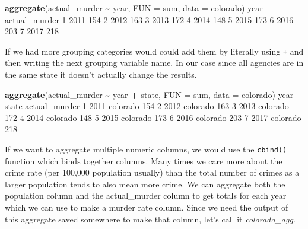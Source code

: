 \documentclass[
  12pt,
]{book}
\newenvironment{Shaded}{\begin{snugshade}}{\end{snugshade}}
\newcommand{\DataTypeTok}[1]{\textcolor[rgb]{0.27,0.27,0.27}{#1}}
\newcommand{\DecValTok}[1]{\textcolor[rgb]{0.06,0.06,0.06}{#1}}
\newcommand{\KeywordTok}[1]{\textcolor[rgb]{0.27,0.27,0.27}{\textbf{#1}}}
\newcommand{\NormalTok}[1]{#1}
\newcommand{\OperatorTok}[1]{\textcolor[rgb]{0.43,0.43,0.43}{\textbf{#1}}}
\newcommand{\StringTok}[1]{\textcolor[rgb]{0.5,0.5,0.5}{#1}}
\begin{document}
\begin{Shaded}
\begin{Highlighting}[]
\KeywordTok{aggregate}\NormalTok{(actual\_murder }\OperatorTok{\textasciitilde{}}\StringTok{ }\NormalTok{year, }\DataTypeTok{FUN =}\NormalTok{ sum, }\DataTypeTok{data =}\NormalTok{ colorado)}
\NormalTok{  year actual\_murder}
\DecValTok{1} \DecValTok{2011}           \DecValTok{154}
\DecValTok{2} \DecValTok{2012}           \DecValTok{163}
\DecValTok{3} \DecValTok{2013}           \DecValTok{172}
\DecValTok{4} \DecValTok{2014}           \DecValTok{148}
\DecValTok{5} \DecValTok{2015}           \DecValTok{173}
\DecValTok{6} \DecValTok{2016}           \DecValTok{203}
\DecValTok{7} \DecValTok{2017}           \DecValTok{218}
\end{Highlighting}
\end{Shaded}

If we had more grouping categories would could add them by literally using \texttt{+} and then writing the next grouping variable name. In our case since all agencies are in the same state it doesn't actually change the results.

\begin{Shaded}
\begin{Highlighting}[]
\KeywordTok{aggregate}\NormalTok{(actual\_murder }\OperatorTok{\textasciitilde{}}\StringTok{ }\NormalTok{year }\OperatorTok{+}\StringTok{ }\NormalTok{state, }\DataTypeTok{FUN =}\NormalTok{ sum, }\DataTypeTok{data =}\NormalTok{ colorado)}
\NormalTok{  year    state actual\_murder}
\DecValTok{1} \DecValTok{2011}\NormalTok{ colorado           }\DecValTok{154}
\DecValTok{2} \DecValTok{2012}\NormalTok{ colorado           }\DecValTok{163}
\DecValTok{3} \DecValTok{2013}\NormalTok{ colorado           }\DecValTok{172}
\DecValTok{4} \DecValTok{2014}\NormalTok{ colorado           }\DecValTok{148}
\DecValTok{5} \DecValTok{2015}\NormalTok{ colorado           }\DecValTok{173}
\DecValTok{6} \DecValTok{2016}\NormalTok{ colorado           }\DecValTok{203}
\DecValTok{7} \DecValTok{2017}\NormalTok{ colorado           }\DecValTok{218}
\end{Highlighting}
\end{Shaded}

If we want to aggregate multiple numeric columns, we would use the \texttt{cbind()} function which binds together columns. Many times we care more about the crime rate (per 100,000 population usually) than the total number of crimes as a larger population tends to also mean more crime. We can aggregate both the population column and the actual\_murder column to get totals for each year which we can use to make a murder rate column. Since we need the output of this aggregate saved somewhere to make that column, let's call it \emph{colorado\_agg}.
\end{document}
